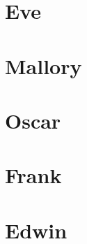 \documentclass[a4paper]{scrreprt}
\begin{document}
\chapter{Eve}



\chapter{Mallory}



\chapter{Oscar}



\chapter{Frank}


\chapter{Edwin}

\end{document}
